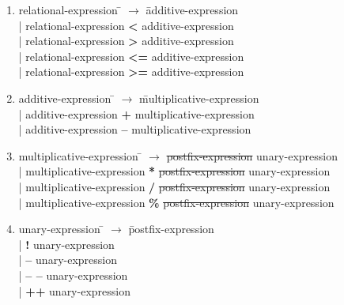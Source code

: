 \begin{enumerate}
\item \begin{tabbing} relational-expression \= $\rightarrow$ \= additive-expression \\
	\> \hspace*{0.05cm} | \> relational-expression \textbf{<}   additive-expression \\
	\> \hspace*{0.05cm} | \> relational-expression \textbf{>}   additive-expression \\
	\> \hspace*{0.05cm} | \> relational-expression \textbf{<=} additive-expression \\
	\> \hspace*{0.05cm} | \> relational-expression \textbf{>=} additive-expression \\
\end{tabbing}

\item \begin{tabbing} additive-expression \= $\rightarrow$ \= multiplicative-expression \\
	\> \hspace*{0.05cm} | \> additive-expression \textbf{+} multiplicative-expression \\
	\> \hspace*{0.05cm} | \> additive-expression \textbf{--} multiplicative-expression \\
\end{tabbing}

\item \begin{tabbing} multiplicative-expression \= $\rightarrow$ \= \sout{postfix-expression} unary-expression \\
	\> \hspace*{0.05cm} | \> multiplicative-expression \textbf{*}   \sout{postfix-expression} unary-expression \\
	\> \hspace*{0.05cm} | \> multiplicative-expression \textbf{/}   \sout{postfix-expression} unary-expression \\
	\> \hspace*{0.05cm} | \> multiplicative-expression \textbf{\%}  \sout{postfix-expression} unary-expression \\
\end{tabbing}

\item \begin{tabbing} unary-expression \= $\rightarrow$ \= postfix-expression \\
	\> \hspace*{0.05cm} | \>  \textbf{!}   unary-expression \\
	\> \hspace*{0.05cm} | \>  \textbf{--}   unary-expression \\
	\> \hspace*{0.05cm} | \>  \textbf{-- --}  unary-expression \\
	\> \hspace*{0.05cm} | \>  \textbf{++}  unary-expression \\
\end{tabbing}


\end{enumerate}
